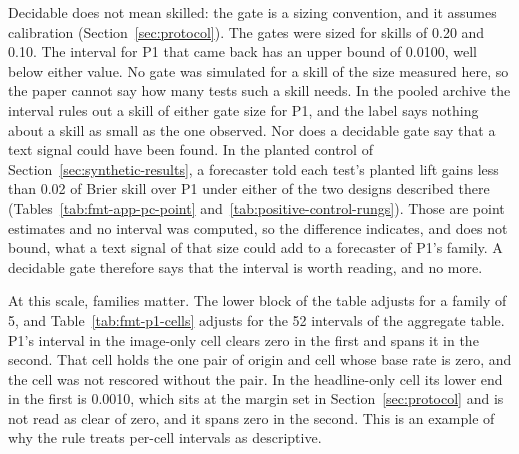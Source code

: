 Decidable does not mean skilled: the gate is a sizing convention, and it assumes calibration (Section~\ref{sec:protocol}). The gates were sized for skills of 0.20 and 0.10. The interval for P1 that came back has an upper bound of 0.0100, well below either value. No gate was simulated for a skill of the size measured here, so the paper cannot say how many tests such a skill needs. In the pooled archive the interval rules out a skill of either gate size for P1, and the label says nothing about a skill as small as the one observed.
Nor does a decidable gate say that a text signal could have been found. In the planted control of Section~\ref{sec:synthetic-results}, a forecaster told each test's planted lift gains less than 0.02 of Brier skill over P1 under either of the two designs described there (Tables~\ref{tab:fmt-app-pc-point} and~\ref{tab:positive-control-rungs}). Those are point estimates and no interval was computed, so the difference indicates, and does not bound, what a text signal of that size could add to a forecaster of P1's family. A decidable gate therefore says that the interval is worth reading, and no more.

At this scale, families matter. The lower block of the table adjusts for a family of 5, and Table~\ref{tab:fmt-p1-cells} adjusts for the 52 intervals of the aggregate table. P1's interval in the image-only cell clears zero in the first and spans it in the second. That cell holds the one pair of origin and cell whose base rate is zero, and the cell was not rescored without the pair. In the headline-only cell its lower end in the first is 0.0010, which sits at the margin set in Section~\ref{sec:protocol} and is not read as clear of zero, and it spans zero in the second. This is an example of why the rule treats per-cell intervals as descriptive.

